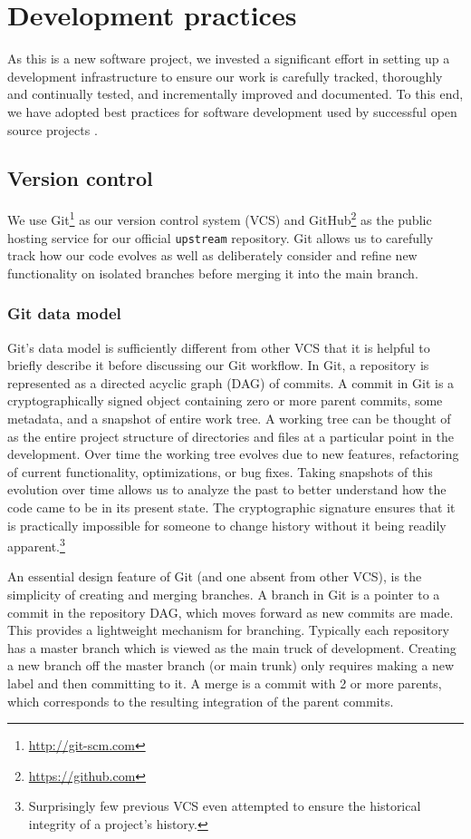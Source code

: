 \chapter{\label{ch:dev}Development practices}

As this is a new software project, we invested a significant effort in setting
up a development infrastructure to ensure our work is carefully tracked,
thoroughly and continually tested, and incrementally improved and documented.
To this end, we have adopted best practices for software development used by
successful open source projects \cite{millman2014}.

\section{\label{sec:vc}Version control}

We use Git\footnote{\url{http://git-scm.com}} as our version control
system (VCS) and GitHub\footnote{\url{https://github.com}} as the public hosting
service for our official \texttt{upstream} repository.  Git allows us to
carefully track how our code evolves as well as deliberately consider and
refine new functionality on isolated branches before merging it into the main
branch.

\subsection{Git data model}

Git's data model is sufficiently different from other VCS that it is helpful to
briefly describe it before discussing our Git workflow.  In Git, a repository
is represented as a directed acyclic graph (DAG) of commits.  A commit in Git
is a cryptographically signed object containing zero or more parent commits,
some metadata, and a snapshot of entire work tree.  A working tree can be
thought of as the entire project structure of directories and files at a
particular point in the development.  Over time the working tree evolves due to
new features, refactoring of current functionality, optimizations, or bug
fixes.  Taking snapshots of this evolution over time allows us to analyze the
past to better understand how the code came to be in its present state.  The
cryptographic signature ensures that it is practically impossible for someone
to change history without it being readily apparent.\footnote{Surprisingly
few previous VCS even attempted to ensure the historical integrity of a
project's history.}

An essential design feature of Git (and one absent from other VCS), is
the simplicity of creating and merging branches.  A branch in Git is a pointer
to a commit in the repository DAG, which moves forward as new commits are made.
This provides a lightweight mechanism for branching.  Typically each repository
has a master branch which is viewed as the main truck of development.  Creating
a new branch off the master branch (or main trunk) only requires making a new
label and then committing to it.  A merge is a commit with 2 or more parents,
which corresponds to the resulting integration of the parent commits.

